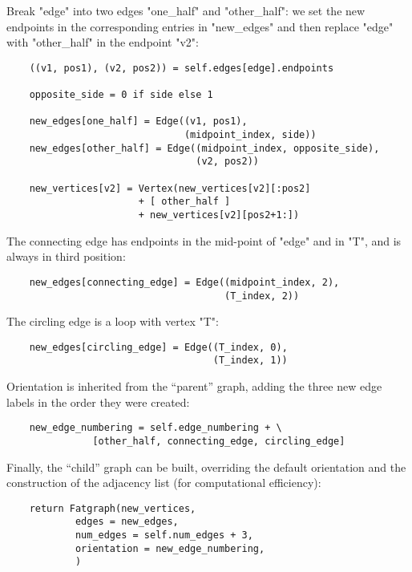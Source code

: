 Break "edge" into two edges "one_half" and "other_half": we set the
new endpoints in the corresponding entries in "new_edges" and then
replace "edge" with "other_half" in the endpoint "v2":
\begin{lstlisting}
    ((v1, pos1), (v2, pos2)) = self.edges[edge].endpoints

    opposite_side = 0 if side else 1

    new_edges[one_half] = Edge((v1, pos1), 
                               (midpoint_index, side))
    new_edges[other_half] = Edge((midpoint_index, opposite_side), 
                                 (v2, pos2))

    new_vertices[v2] = Vertex(new_vertices[v2][:pos2]
                       + [ other_half ]
                       + new_vertices[v2][pos2+1:])

\end{lstlisting}

The connecting edge has endpoints in the mid-point of
"edge" and in "T", and is always in third position:
\begin{lstlisting}
    new_edges[connecting_edge] = Edge((midpoint_index, 2), 
                                      (T_index, 2))

\end{lstlisting}

The circling edge is a loop with vertex "T":
\begin{lstlisting}
    new_edges[circling_edge] = Edge((T_index, 0), 
                                    (T_index, 1))

\end{lstlisting}

Orientation is inherited from the ``parent'' graph, adding the three
new edge labels in the order they were created:
\begin{lstlisting}
    new_edge_numbering = self.edge_numbering + \
               [other_half, connecting_edge, circling_edge]

\end{lstlisting}

Finally, the ``child'' graph can be built, overriding the default
orientation and the construction of the adjacency list (for
computational efficiency):
\begin{lstlisting}
    return Fatgraph(new_vertices,
            edges = new_edges,
            num_edges = self.num_edges + 3,
            orientation = new_edge_numbering,
            )
\end{lstlisting}


